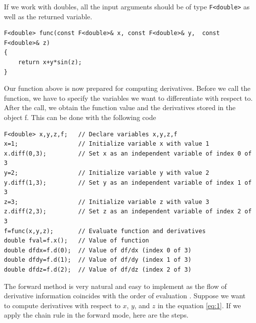 If we work with doubles, all the input arguments should be of type \texttt{F<double>} as well as the returned variable.
\begin{lstlisting}[numbers=none]
F<double> func(const F<double>& x, const F<double>& y,  const F<double>& z)
{
	return x+y*sin(z);
}
\end{lstlisting}
Our function above is now prepared for computing derivatives. Before we call the function, we have to specify the variables we want to differentiate with respect to.  After the call, we obtain the function value and the derivatives stored in the object f. This can be done with the following code
\begin{lstlisting}[numbers=none]
F<double> x,y,z,f;   // Declare variables x,y,z,f
x=1;                 // Initialize variable x with value 1
x.diff(0,3);         // Set x as an independent variable of index 0 of 3
y=2;                 // Initialize variable y with value 2
y.diff(1,3);         // Set y as an independent variable of index 1 of 3
z=3;                 // Initialize variable z with value 3
z.diff(2,3);         //	Set z as an independent variable of index 2 of 3
f=func(x,y,z);       // Evaluate function and derivatives
double fval=f.x();   // Value of function
double dfdx=f.d(0);  // Value of df/dx (index 0 of 3)
double dfdy=f.d(1);  // Value of df/dy (index 1 of 3)
double dfdz=f.d(2);  // Value of df/dz (index 2 of 3)
\end{lstlisting}
The forward method is very natural and easy to implement as the flow of derivative information coincides with the order of evaluation \cite{wikiAD}. Suppose we want to compute derivatives with respect to $x$, $y$, and $z$ in the equation \ref{eq:1}. If we apply the chain rule in the forward mode, here are the steps.

